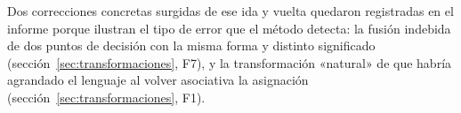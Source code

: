 Dos correcciones concretas surgidas de ese ida y vuelta quedaron registradas en el informe porque
ilustran el tipo de error que el método detecta: la fusión indebida de dos puntos de decisión con
la misma forma y distinto significado (sección~\ref{sec:transformaciones}, F7), y la
transformación «natural» de  que habría agrandado el lenguaje al volver asociativa
la asignación (sección~\ref{sec:transformaciones}, F1).
